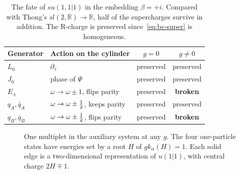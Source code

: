 \begin{table}[t]
\centering
\renewcommand{\arraystretch}{1.2}
\begin{tabular}{@{}llcc@{}}
\toprule
Generator & Action on the cylinder & $g=0$ & $g\neq0$\\
\midrule
$L_0$ & $\partial_\tau$ & preserved & preserved\\
$J_0$ & phase of $\Psi$ & preserved & preserved\\
$E_\pm$ & $\omega\to\omega\pm1$, flips parity & preserved & \textbf{broken}\\
$q_A,\bar q_A$ & $\omega\to\omega\pm\tfrac12$, keeps parity & preserved & preserved\\
$q_B,\bar q_B$ & $\omega\to\omega\pm\tfrac12$, flips parity & preserved & \textbf{broken}\\
\bottomrule
\end{tabular}
\caption{The fate of $su(1,1|1)$ in the embedding $\beta=+i$. Compared with Thong's $sl(2,\mathbb R)\to\mathbb R$, half of the supercharges survive in addition. The R-charge is preserved since~\eqref{eq:bc-super} is homogeneous.}
\label{tab:breaking}
\end{table}

\begin{figure}[t]
\centering
{}
\caption{One multiplet in the auxiliary system at any $g$. The four one-particle states have energies set by a root $H$ of $gk_\alpha(H)=1$. Each solid edge is a two-dimensional representation of $u(1|1)$, with central charge $2H\mp1$.}
\label{fig:multiplet}
\end{figure}

